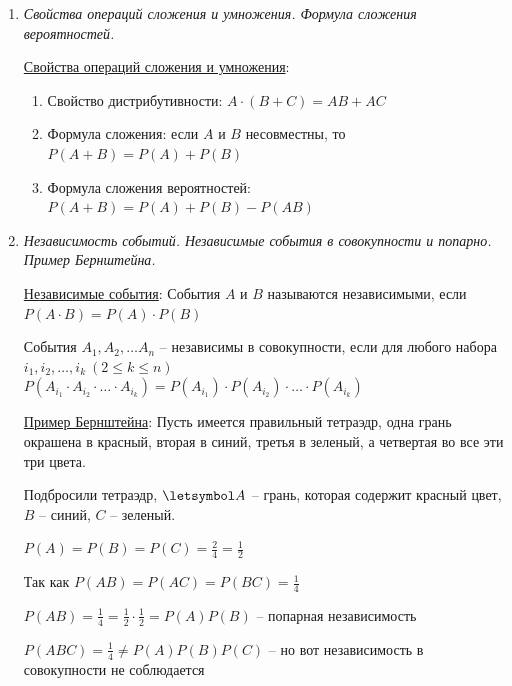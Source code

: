 \begin{enumerate}
\begin{MyProof}
        $P(A_1) = \sum_{i = 1}^\infty P(A_i \overline{A_{i + 1}}) = \sum_{i = 1}^{n - 1} P(A_i \overline{A_{i + 1}}) + P(A_n)$ и $P(A_n) \underset{n \to \infty}{\to} 0$ по необходимому признаку сходимости
    \end{MyProof}

    \item \textit{Свойства операций сложения и умножения. Формула сложения вероятностей.}

    \hyperlink{probabilityoperationsproperties}{Свойства операций сложения и умножения}:

    \begin{enumerate}
        \item Свойство дистрибутивности: $A \cdot (B + C) = AB + AC$

        \item Формула сложения: если $A$ и $B$ несовместны, то $P(A + B) = P(A) + P(B)$

        \item Формула сложения вероятностей: $P(A + B) = P(A) + P(B) - P(AB)$
    \end{enumerate}

    \item \textit{Независимость событий. Независимые события в совокупности и попарно. Пример Бернштейна. }

    \hyperlink{independantevents}{Независимые события}: События $A$ и $B$ называются независимыми, если $P(A \cdot B) = P(A) \cdot P(B)$

    События $A_1, A_2, \dots A_n$ -- независимы в совокупности, если для любого набора $i_1, i_2, \dots, i_k \ (2 \leq k \leq n)$
    $P(A_{i_1} \cdot A_{i_2} \cdot \dots \cdot A_{i_k}) = P(A_{i_1}) \cdot P(A_{i_2}) \cdot \dots \cdot P(A_{i_k})$

    \hyperlink{bernshteinsexample}{Пример Бернштейна}: Пусть имеется правильный тетраэдр, одна грань окрашена в красный, вторая в синий, третья в зеленый, а четвертая во все эти три цвета.

    Подбросили тетраэдр, $\letsymbol A$ -- грань, которая содержит красный цвет, $B$ -- синий, $C$ -- зеленый.

    $P(A) = P(B) = P(C) = \frac{2}{4} = \frac{1}{2}$

    Так как $P(AB) = P(AC) = P(BC) = \frac{1}{4}$

    $P(AB) = \frac{1}{4} = \frac{1}{2} \cdot \frac{1}{2} = P(A) P(B)$ -- попарная независимость

    $P(ABC) = \frac{1}{4} \neq P(A) P(B) P(C)$ -- но вот независимость в совокупности не соблюдается


\end{enumerate}
